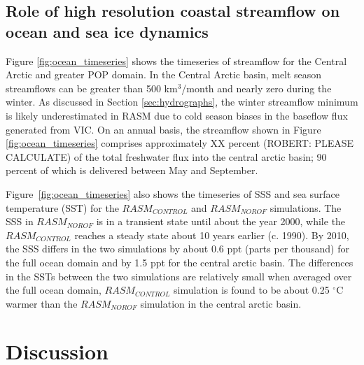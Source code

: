 \documentclass[jgrga, draft]{agutex}
\begin{document}
\begin{article}
\subsection{Role of high resolution coastal streamflow on ocean and sea ice dynamics}
\label{sec:ocean}

Figure \ref{fig:ocean_timeseries} shows the timeseries of streamflow for the Central Arctic and greater POP domain.
In the Central Arctic basin, melt season streamflows can be greater than 500 km$^3$/month and nearly zero during the winter.
As discussed in Section \ref{sec:hydrographs}, the winter streamflow minimum is likely underestimated in RASM due to cold season biases in the baseflow flux generated from VIC.
On an annual basis, the streamflow shown in Figure \ref{fig:ocean_timeseries} comprises approximately XX percent (ROBERT: PLEASE CALCULATE) of the total freshwater flux into the central arctic basin; 90 percent of which is delivered between May and September. %

Figure~\ref{fig:ocean_timeseries} also shows the timeseries of SSS and sea surface temperature (SST) for the $RASM_{CONTROL}$ and $RASM_{NOROF}$ simulations.
The SSS in $RASM_{NOROF}$ is in a transient state until about the year 2000, while the $RASM_{CONTROL}$ reaches a steady state about 10 years earlier (c. 1990).
By 2010, the SSS differs in the two simulations by about 0.6 ppt (parts per thousand) for the full ocean domain and by 1.5 ppt for the central arctic basin.
The differences in the SSTs between the two simulations are relatively small when averaged over the full ocean domain, $RASM_{CONTROL}$ simulation is found to be about 0.25 $^{\circ}$C warmer than the $RASM_{NOROF}$ simulation in the central arctic basin.


\section{Discussion}
\label{sec:discussion}


\end{article}
\end{document}
